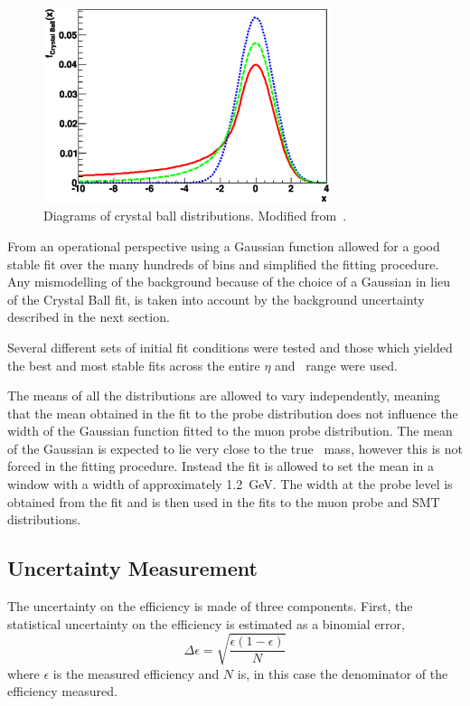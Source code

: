 \begin{figure}[htbp]
  \centering
  \includegraphics[width=0.75\textwidth]{PartCalibration2012/Plots/CrystalBallFunction.eps}
  \caption[Diagrams of crystal ball distributions.]{Diagrams of crystal ball distributions. Modified from~\cite{Calibration:CBFunction}.}
  \label{fig:CalibrationCBDist}
\end{figure}

From an operational perspective using a Gaussian function allowed for a good stable fit over the many hundreds of bins and simplified the fitting procedure. Any mismodelling of the background because of the choice of a Gaussian in lieu of the Crystal Ball fit, is taken into account by the background uncertainty described in the next section.

Several different sets of initial fit conditions were tested and those which yielded the best and most stable fits across the entire $\eta$ and \pt\ range were used.

The means of all the distributions are allowed to vary independently, meaning that the mean obtained in the fit to the probe distribution does not influence the width of the Gaussian function fitted to the muon probe distribution. The mean of the Gaussian is expected to lie very close to the true \jpsi\ mass, however this is not forced in the fitting procedure. Instead the fit is allowed to set the mean in a window with a width of approximately \SI{1.2}{\GeV}. The width at the probe level is obtained from the fit and is then used in the fits to the muon probe and SMT distributions.

\subsection{Uncertainty Measurement} \label{sec:CalibrationUncertainty}

The uncertainty on the efficiency is made of three components. First, the statistical uncertainty on the efficiency is estimated as a binomial error,
%
\begin{equation}
  \Delta\epsilon = \sqrt{\frac{\epsilon(1-\epsilon)}{N}}
\end{equation}
%
where $\epsilon$ is the measured efficiency and $N$ is, in this case the denominator of the efficiency measured.

